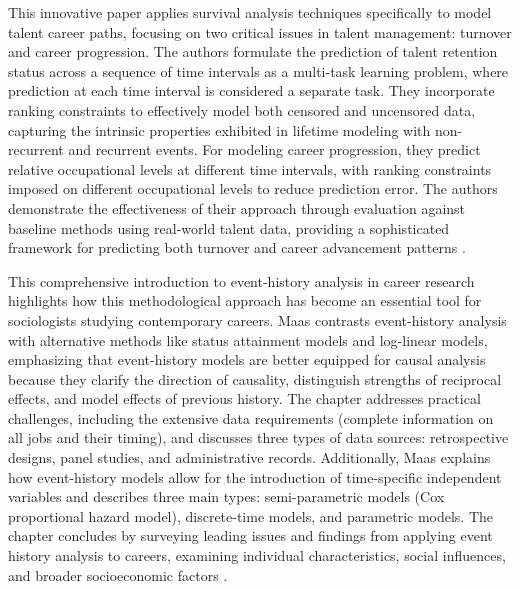 \documentclass[../main.tex]{subfiles}
\begin{document}
This innovative paper applies survival analysis techniques specifically to model talent career paths, focusing on two critical issues in talent management: turnover and career progression. The authors formulate the prediction of talent retention status across a sequence of time intervals as a multi-task learning problem, where prediction at each time interval is considered a separate task. They incorporate ranking constraints to effectively model both censored and uncensored data, capturing the intrinsic properties exhibited in lifetime modeling with non-recurrent and recurrent events. For modeling career progression, they predict relative occupational levels at different time intervals, with ranking constraints imposed on different occupational levels to reduce prediction error. The authors demonstrate the effectiveness of their approach through evaluation against baseline methods using real-world talent data, providing a sophisticated framework for predicting both turnover and career advancement patterns \citep{li2016prospecting}.

This comprehensive introduction to event-history analysis in career research highlights how this methodological approach has become an essential tool for sociologists studying contemporary careers. Maas contrasts event-history analysis with alternative methods like status attainment models and log-linear models, emphasizing that event-history models are better equipped for causal analysis because they clarify the direction of causality, distinguish strengths of reciprocal effects, and model effects of previous history. The chapter addresses practical challenges, including the extensive data requirements (complete information on all jobs and their timing), and discusses three types of data sources: retrospective designs, panel studies, and administrative records. Additionally, Maas explains how event-history models allow for the introduction of time-specific independent variables and describes three main types: semi-parametric models (Cox proportional hazard model), discrete-time models, and parametric models. The chapter concludes by surveying leading issues and findings from applying event history analysis to careers, examining individual characteristics, social influences, and broader socioeconomic factors \citep{maas2003use}.
\end{document}
